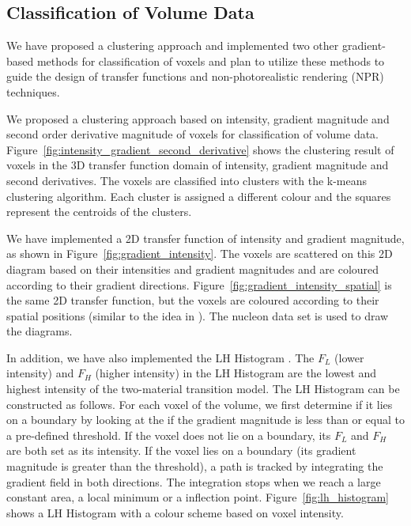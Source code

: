 \subsection{Classification of Volume Data \label{classification_of_boundaries}}
We have proposed a clustering approach and implemented two other gradient-based methods for classification of voxels and plan to utilize these methods to guide the design of transfer functions and non-photorealistic rendering (NPR) techniques.

We proposed a clustering approach based on intensity, gradient magnitude and second order derivative magnitude of voxels for classification of volume data. Figure~\ref{fig:intensity_gradient_second_derivative} shows the clustering result of voxels in the 3D transfer function domain of intensity, gradient magnitude and second derivatives. The voxels are classified into clusters with the k-means clustering algorithm. Each cluster is assigned a different colour and the squares represent the centroids of the clusters.

We have implemented a 2D transfer function of intensity and gradient magnitude, as shown in Figure~\ref{fig:gradient_intensity}. The voxels are scattered on this 2D diagram based on their intensities and gradient magnitudes and are coloured according to their gradient directions.
Figure~\ref{fig:gradient_intensity_spatial} is the same 2D transfer function, but the voxels are coloured according to their spatial positions (similar to the idea in \cite{roettger_spatialized_2005}). The nucleon data set is used to draw the diagrams.

In addition, we have also implemented the LH Histogram \cite{sereda_visualization_2006}. The $ F_{L} $ (lower intensity) and $ F_{H} $ (higher intensity) in the LH Histogram are the lowest and highest intensity of the two-material transition model.
The LH Histogram can be constructed as follows.
For each voxel of the volume, we first determine if it lies on a boundary by looking at the if the gradient magnitude is less than or equal to a pre-defined threshold. If the voxel does not lie on a boundary, its $ F_{L} $ and $ F_{H} $ are both set as its intensity. If the voxel lies on a boundary (its gradient magnitude is greater than the threshold), a path is tracked by integrating the gradient field in both directions. The integration stops when we reach a large constant area, a local minimum or a inflection point. Figure~\ref{fig:lh_histogram} shows a LH Histogram with a colour scheme based on voxel intensity.

